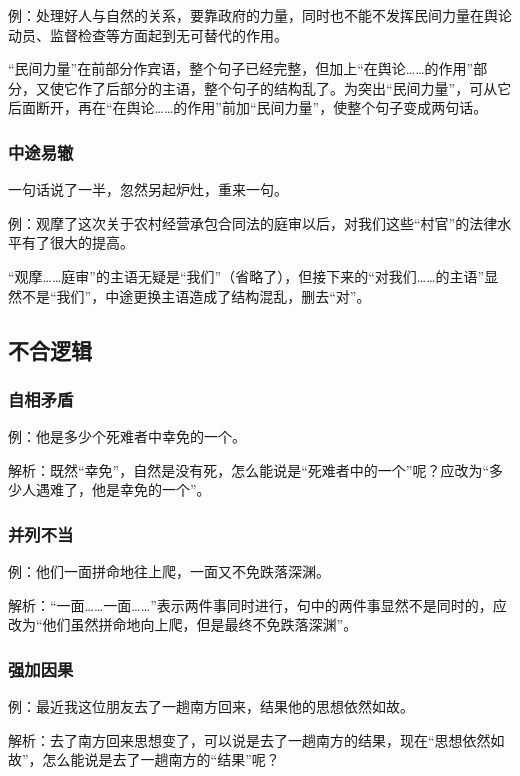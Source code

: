 例：处理好人与自然的关系，要靠政府的力量，同时也不能不发挥民间力量在舆论动员、监督检查等方面起到无可替代的作用。

“民间力量”在前部分作宾语，整个句子已经完整，但加上“在舆论……的作用”部分，又使它作了后部分的主语，整个句子的结构乱了。为突出“民间力量”，可从它后面断开，再在“在舆论……的作用”前加“民间力量”，使整个句子变成两句话。

\subsubsection{中途易辙}

一句话说了一半，忽然另起炉灶，重来一句。

例：观摩了这次关于农村经营承包合同法的庭审以后，对我们这些“村官”的法律水平有了很大的提高。

“观摩……庭审”的主语无疑是“我们”（省略了），但接下来的“对我们……的主语”显然不是“我们”，中途更换主语造成了结构混乱，删去“对”。

\subsection{不合逻辑}

\subsubsection{自相矛盾}

例：他是多少个死难者中幸免的一个。

解析：既然“幸免”，自然是没有死，怎么能说是“死难者中的一个”呢？应改为“多少人遇难了，他是幸免的一个”。

\subsubsection{并列不当}

例：他们一面拼命地往上爬，一面又不免跌落深渊。

解析：“一面……一面……”表示两件事同时进行，句中的两件事显然不是同时的，应改为“他们虽然拼命地向上爬，但是最终不免跌落深渊”。

\subsubsection{强加因果}

例：最近我这位朋友去了一趟南方回来，结果他的思想依然如故。

解析：去了南方回来思想变了，可以说是去了一趟南方的结果，现在“思想依然如故”，怎么能说是去了一趟南方的“结果”呢？


